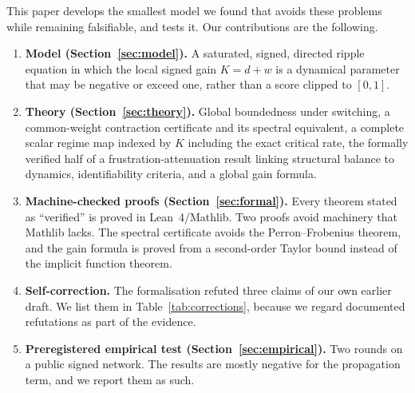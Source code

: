 \documentclass[11pt]{article}
\theoremstyle{definition}
\theoremstyle{remark}
\begin{document}
This paper develops the smallest model we found that avoids these problems while remaining
falsifiable, and tests it. Our contributions are the following.

\begin{enumerate}
\item \textbf{Model (Section~\ref{sec:model}).} A saturated, signed, directed ripple equation in which the
      local signed gain $K=d+w$ is a dynamical parameter that may be negative or exceed one, rather
      than a score clipped to $[0,1]$.
\item \textbf{Theory (Section~\ref{sec:theory}).} Global boundedness under switching, a common-weight
      contraction certificate and its spectral equivalent, a complete scalar regime map indexed by $K$
      including the exact critical rate, the formally verified half of a frustration-attenuation result
      linking structural balance to dynamics, identifiability criteria, and a global gain formula.
\item \textbf{Machine-checked proofs (Section~\ref{sec:formal}).} Every theorem stated as ``verified'' is
      proved in Lean~4/Mathlib. Two proofs avoid machinery that Mathlib lacks. The spectral certificate
      avoids the Perron--Frobenius theorem, and the gain formula is proved from a second-order Taylor
      bound instead of the implicit function theorem.
\item \textbf{Self-correction.} The formalisation refuted three claims of our own earlier draft. We list
      them in Table~\ref{tab:corrections}, because we regard documented refutations as part of the
      evidence.
\item \textbf{Preregistered empirical test (Section~\ref{sec:empirical}).} Two rounds on a public signed
      network. The results are mostly negative for the propagation term, and we report them as such.
\end{enumerate}
\end{document}
